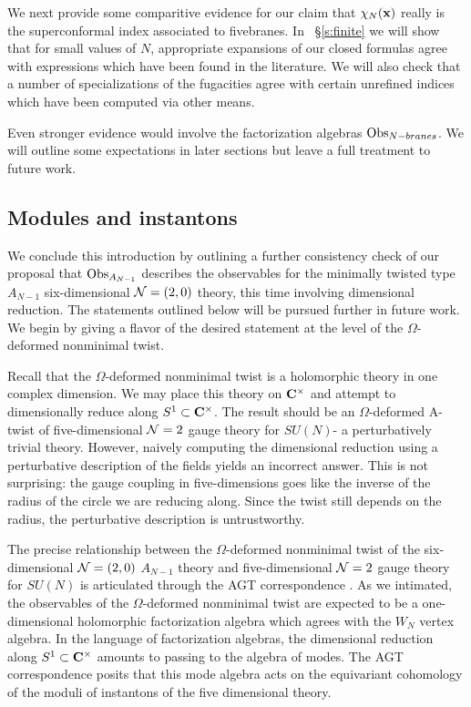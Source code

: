 We next provide some comparitive evidence for our claim that $\chi_N({\bf x})$ really is the superconformal index associated to fivebranes.
In ~\S\ref{s:finite} we will show that for small values of $N$, appropriate expansions of our closed formulas agree with expressions which have been found in the literature.
We will also check that a number of specializations of the fugacities agree with certain unrefined indices which have been computed via other means.

Even stronger evidence would involve the factorization algebras $\operatorname{Obs}_{N-branes}$. We will outline some expectations in later sections but leave a full treatment to future work.

\subsection{Modules and instantons}
We conclude this introduction by outlining a further consistency check of our proposal that $\operatorname{Obs}_{A_{N-1}}$ describes the observables for the minimally twisted type $A_{N-1}$ six-dimensional $\mathcal N=(2,0)$ theory, this time involving dimensional reduction. The statements outlined below will be pursued further in future work. We begin by giving a flavor of the desired statement at the level of the $\Omega$-deformed nonminimal twist.

Recall that the $\Omega$-deformed nonminimal twist is a holomorphic theory in one complex dimension. We may place this theory on $\mathbf{C}^{\times}$ and attempt to dimensionally reduce along $S^{1}\subset \mathbf{C}^{\times}$. The result should be an $\Omega$-deformed A-twist of five-dimensional $\mathcal N =2$ gauge theory for $SU(N)$- a perturbatively trivial theory. However, naively computing the dimensional reduction using a perturbative description of the fields yields an incorrect answer. This is not surprising: the gauge coupling in five-dimensions goes like the inverse of the radius of the circle we are reducing along. Since the twist still depends on the radius, the perturbative description is untrustworthy.

The precise relationship between the $\Omega$-deformed nonminimal twist of the six-dimensional $\mathcal N=(2,0)$ $A_{N-1}$ theory and five-dimensional $\mathcal N=2$ gauge theory for $SU(N)$ is articulated through the AGT correspondence \cite{AGT}. As we intimated, the observables of the $\Omega$-deformed nonminimal twist are expected to be a one-dimensional holomorphic factorization algebra which agrees with the $W_{N}$ vertex algebra. In the language of factorization algebras, the dimensional reduction along $S^{1}\subset \mathbf{C}^{\times}$ amounts to passing to the algebra of modes. The AGT correspondence posits that this mode algebra acts on the equivariant cohomology of the moduli of instantons of the five dimensional theory.

